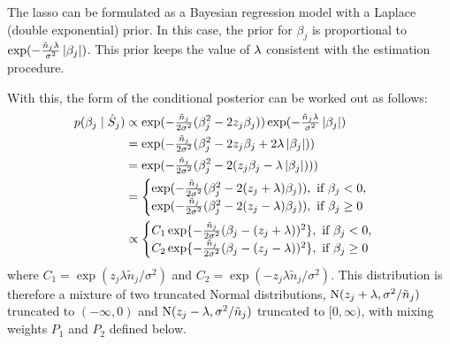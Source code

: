 The lasso can be formulated as a Bayesian regression model with a Laplace (double exponential) prior. In this case, the prior for $\beta_j$ is proportional to $\exp(-\frac{\tilde{n}_j \lambda} {\sigma^2} \left\lvert\beta_j\right\rvert)$. This prior keeps the value of $\lambda$ consistent with the estimation procedure.

With this, the form of the conditional posterior can be worked out as follows:
\begin{align*}
  p(\beta_j \mid \hat{S}_j) &\propto \exp(-\tfrac{\tilde{n}_j}{2\sigma^2} (\beta_j^2 - 2z_j\beta_j)) \exp(-\tfrac{\tilde{n}_j \lambda} {\sigma^2} \left\lvert\beta_j\right\rvert) \\
                            &= \exp(-\tfrac{\tilde{n}_j}{2\sigma^2} (\beta_j^2 - 2 z_j\beta_j +  2 \lambda \left\lvert\beta_j\right\rvert)) \\
                            &= \exp(-\tfrac{\tilde{n}_j}{2\sigma^2} (\beta_j^2 - 2(z_j\beta_j - \lambda \left\lvert\beta_j\right\rvert))) \\
                            &=
                              \begin{cases}
                                \exp(-\frac{\tilde{n}_j}{2\sigma^2} (\beta_j^2 - 2(z_j + \lambda)\beta_j)), \text{ if } \beta_j < 0, \\
                                \exp(-\frac{\tilde{n}_j}{2\sigma^2} (\beta_j^2 - 2(z_j - \lambda)\beta_j )), \text{ if } \beta_j \geq 0 \\
                              \end{cases} \\
                            &\propto
                              \begin{cases}
                                C_{1} \exp\{-\frac{\tilde{n}_j}{2\sigma^2} (\beta_j - (z_j + \lambda))^2\}, \text{ if } \beta_j < 0, \\
                                C_{2} \exp\{-\frac{\tilde{n}_j}{2\sigma^2} (\beta_j - (z_j - \lambda))^2\}, \text{ if } \beta_j \geq 0 \\
                              \end{cases}
\end{align*}
where $C_{1} = \exp(z_j \lambda \tilde{n}_j/\sigma^2)$ and $C_{2} = \exp(-z_j \lambda \tilde{n}_j/\sigma^2)$. This distribution is therefore a mixture of two truncated Normal distributions, $\textrm{N}(z_j + \lambda, \sigma^2/\tilde{n}_j)$ truncated to $(-\infty, 0)$ and $\textrm{N}(z_j - \lambda, \sigma^2/\tilde{n}_j)$ truncated to $[0, \infty)$, with mixing weights $P_1$ and $P_2$ defined below.

